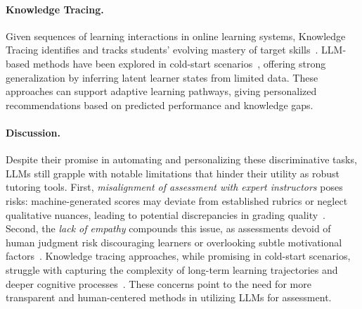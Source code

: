 

\paragraph{Knowledge Tracing.} Given sequences of learning interactions in online learning systems, Knowledge Tracing identifies and tracks students’ evolving mastery of target skills~\cite{shen2024survey,xu2023learning}. LLM-based methods have been explored in cold-start scenarios~\cite{zhan2024knowledge,jung2024clst}, offering strong generalization by inferring latent learner states from limited data. These approaches can support adaptive learning pathways, giving personalized recommendations based on predicted performance and knowledge gaps.


\paragraph{Discussion.} Despite their promise in automating and personalizing these discriminative tasks, LLMs still grapple with notable limitations that hinder their utility as robust tutoring tools. First, \emph{misalignment of assessment with expert instructors} poses risks: machine-generated scores may deviate from established rubrics or neglect qualitative nuances, leading to potential discrepancies in grading quality~\cite{kundu2024large}. Second, the \textit{lack of empathy} compounds this issue, as assessments devoid of human judgment risk discouraging learners or overlooking subtle motivational factors~\cite{sharma2024comuniqa}. Knowledge tracing approaches, while promising in cold-start scenarios, struggle with capturing the complexity of long-term learning trajectories and deeper cognitive processes~\cite{cho2024systematic}. These concerns point to the need for more transparent and human-centered methods in utilizing LLMs for assessment.

